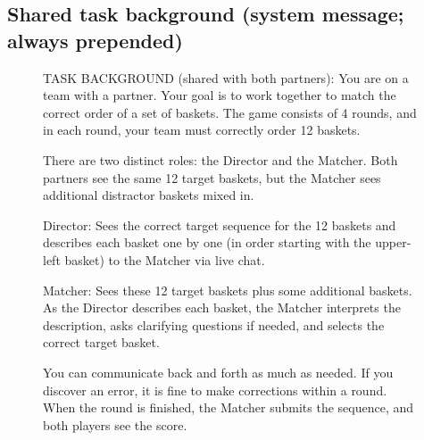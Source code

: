 \subsection{Shared task background (system message; always prepended)}
\begin{figure}[t]
\begin{promptbox}
TASK BACKGROUND (shared with both partners):
You are on a team with a partner. Your goal is to work together to match the correct order of a set of baskets. The game consists of 4 rounds, and in each round, your team must correctly order 12 baskets.

There are two distinct roles: the Director and the Matcher. Both partners see the same 12 target baskets, but the Matcher sees additional distractor baskets mixed in.

Director: Sees the correct target sequence for the 12 baskets and describes each basket one by one (in order starting with the upper-left basket) to the Matcher via live chat.

Matcher: Sees these 12 target baskets plus some additional baskets. As the Director describes each basket, the Matcher interprets the description, asks clarifying questions if needed, and selects the correct target basket.

You can communicate back and forth as much as needed. If you discover an error, it is fine to make corrections within a round. When the round is finished, the Matcher submits the sequence, and both players see the score.
\end{promptbox}
\end{figure}

